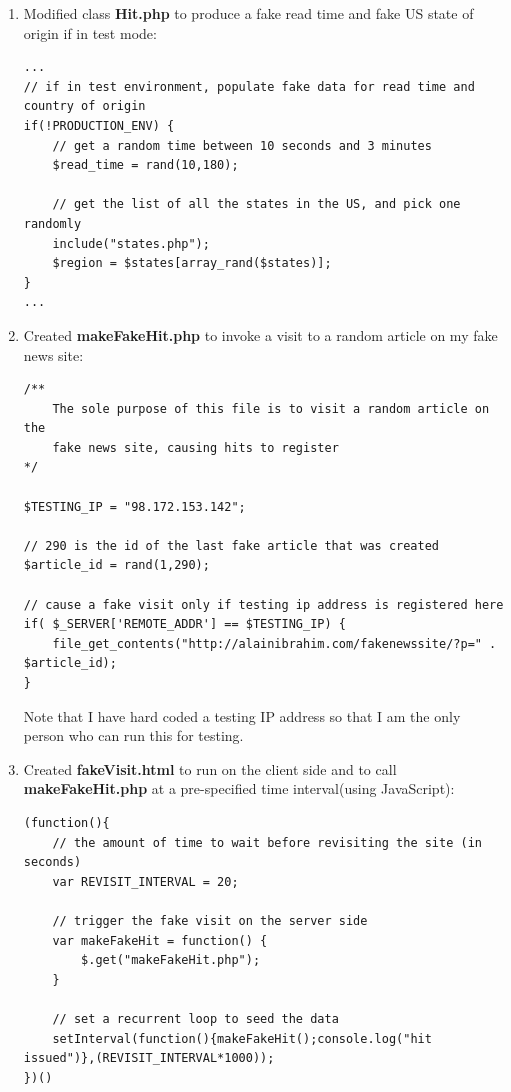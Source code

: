 \documentclass[12pt]{article}
\begin{document}
{\begin{enumerate}
\begin{lstlisting}[basicstyle=\scriptsize]
// defines whether we are in test or production mode
define(PRODUCTION_ENV,false);
\end{lstlisting}

\item{Modified class \textbf{Hit.php} to produce a fake read time and fake US state of origin if in test mode:}
\begin{lstlisting}[basicstyle=\scriptsize]
...
// if in test environment, populate fake data for read time and country of origin
if(!PRODUCTION_ENV) {
	// get a random time between 10 seconds and 3 minutes
	$read_time = rand(10,180);
	
	// get the list of all the states in the US, and pick one randomly
	include("states.php");
	$region = $states[array_rand($states)];
}
...
\end{lstlisting} 
\item{Created \textbf{makeFakeHit.php} to invoke a visit to a random article on my fake news site:}
\begin{lstlisting}[basicstyle=\scriptsize]
/**
	The sole purpose of this file is to visit a random article on the 
	fake news site, causing hits to register
*/

$TESTING_IP = "98.172.153.142";

// 290 is the id of the last fake article that was created
$article_id = rand(1,290);

// cause a fake visit only if testing ip address is registered here
if( $_SERVER['REMOTE_ADDR'] == $TESTING_IP) {
	file_get_contents("http://alainibrahim.com/fakenewssite/?p=" . $article_id);
}
\end{lstlisting}
Note that I have hard coded a testing IP address so that I am the only person who can run this for testing. \\
\item{Created \textbf{fakeVisit.html} to run on the client side and to call \textbf{makeFakeHit.php} at a pre-specified time interval(using JavaScript):}
\begin{lstlisting}[basicstyle=\scriptsize]
(function(){
	// the amount of time to wait before revisiting the site (in seconds)
	var REVISIT_INTERVAL = 20;

	// trigger the fake visit on the server side
	var makeFakeHit = function() {
		$.get("makeFakeHit.php");
	}
	
	// set a recurrent loop to seed the data
	setInterval(function(){makeFakeHit();console.log("hit issued")},(REVISIT_INTERVAL*1000));
})()
\end{lstlisting}
\end{enumerate}

}
\end{document}
